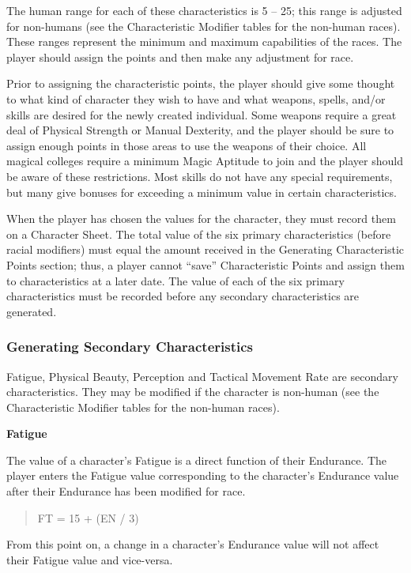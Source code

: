 \begin{multicols*}{3}
The human range for each of these characteristics is 5 -- 25; this
range is adjusted for non-humans (see the Characteristic Modifier
tables for the non-human races). These ranges represent the minimum
and maximum capabilities of the races. The player should assign the
points and then make any adjustment for race.

Prior to assigning the characteristic points, the player should give
some thought to what kind of character they wish to have and what
weapons, spells, and/or skills are desired for the newly created
individual. Some weapons require a great deal of Physical Strength or
Manual Dexterity, and the player should be sure to assign enough
points in those areas to use the weapons of their choice. All magical
colleges require a minimum Magic Aptitude to join and the player
should be aware of these restrictions. Most skills do not have any
special requirements, but many give bonuses for exceeding a minimum
value in certain characteristics.

When the player has chosen the values for the character, they must
record them on a Character Sheet. The total value of the six primary
characteristics (before racial modifiers) must equal the amount
received in the Generating Characteristic Points section; thus, a
player cannot ``save'' Characteristic Points and assign them to
characteristics at a later date. The value of each of the six primary
characteristics must be recorded before any secondary characteristics
are generated.

\subsubsection{Generating Secondary Characteristics}

Fatigue, Physical Beauty, Perception and Tactical Movement Rate are
secondary characteristics. They may be modified if the character is
non-human (see the Characteristic Modifier tables for the non-human
races).

\textbf{Fatigue}

The value of a character's Fatigue is a direct function of their
Endurance. The player enters the Fatigue value corresponding to the
character's Endurance value after their Endurance has been modified
for race.

\begin{quote}
FT = 15 + (EN / 3)
\end{quote}

From this point on, a change in a character's Endurance value will not
affect their Fatigue value and vice-versa.


\end{multicols*}
